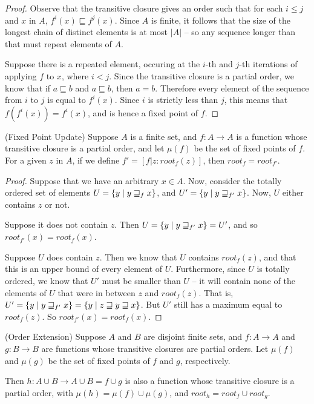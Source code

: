 \begin{proof}
Observe that the transitive closure gives an order such that for
each $i \leq j$ and $x$ in $A$, $f^i(x) \sqsubseteq f^j(x)$. Since
$A$ is finite, it follows that the size of the longest chain of
distinct elements is at most $|A|$ -- so any sequence longer 
than that must repeat elements of $A$. 

Suppose there is a repeated element, occuring at the $i$-th and
$j$-th iterations of applying $f$ to $x$, where $i < j$. Since the
transitive closure is a partial order, we know that if $a \sqsubseteq
b$ and $a \sqsubseteq b$, then $a = b$. Therefore every element 
of the sequence from $i$ to $j$ is equal to $f^i(x)$. Since $i$ is
strictly less than $j$, this means that $f(f^i(x)) = f^i(x)$, and 
is hence a fixed point of $f$. 
\end{proof}

\begin{lemma}{(Fixed Point Update)}
Suppose $A$ is a finite set, and $f : A \to A$ is a function whose
transitive closure is a partial order, and let $\mu(f)$ be the set of
fixed points of $f$. For a given $z$ in $A$, if we define $f' =
[f|z:\mathit{root}_f(z)]$, then $\mathit{root}_f = \mathit{root}_{f'}$. 
\end{lemma}

\begin{proof}
Suppose that we have an arbitrary $x \in A$. Now, consider the totally
ordered set of elements $U = \{{{y}\;|\;{y \sqsupseteq_f x}}\}$, and 
$U' = \{{{y}\;|\;{y \sqsupseteq_{f'} x}}\}$. Now, $U$ either contains 
$z$ or not.

Suppose it does not contain $z$. Then $U = \{{{y}\;|\;{y
  \sqsupseteq_{f'} x}}\} = U'$, and so $\mathit{root}_{f'}(x) =
\mathit{root}_f(x)$.

Suppose $U$ does contain $z$. Then we know that $U$ contains
$\mathit{root}_f(z)$, and that this is an upper bound of every element
of $U$. Furthermore, since $U$ is totally ordered, we know that $U'$
must be smaller than $U$ -- it will contain none of the elements of
$U$ that were in between $z$ and $\mathit{root}_f(z)$.  That is, $U' =
\{{{y}\;|\;{y \sqsupseteq_{f'} x}}\} = \{{{y}\;|\;{ z \sqsupseteq y
  \sqsupseteq x }}\}$. But $U'$ still has a maximum equal to
$\mathit{root}_f(z)$. So $\mathit{root}_{f'}(x) =
\mathit{root}_{f}(x)$.
\end{proof}

\begin{lemma}{(Order Extension)}
Suppose $A$ and $B$ are disjoint finite sets, and $f : A \to A$ and $g
: B \to B$ are functions whose transitive closures are partial
orders. Let $\mu(f)$ and $\mu(g)$ be the set of fixed points of $f$
and $g$, respectively. 

Then $h : A \cup B \to A \cup B = f \cup g$ is also a function whose 
transitive closure is a partial order, with $\mu(h) = \mu(f) \cup \mu(g)$, 
and $\mathit{root}_h = \mathit{root}_f \cup \mathit{root}_g$. 
\end{lemma}


